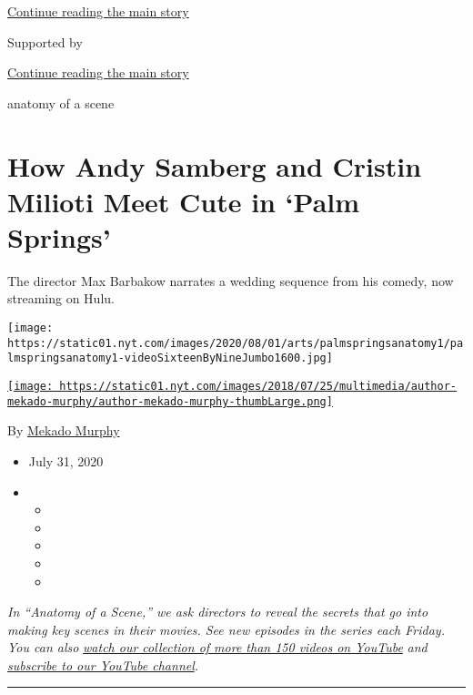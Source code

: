 \protect\hyperlink{after-top}{Continue reading the main story}

Supported by

\protect\hyperlink{after-sponsor}{Continue reading the main story}

anatomy of a scene

\hypertarget{how-andy-samberg-and-cristin-milioti-meet-cute-in-palm-springs}{%
\section{How Andy Samberg and Cristin Milioti Meet Cute in `Palm
Springs'}\label{how-andy-samberg-and-cristin-milioti-meet-cute-in-palm-springs}}

The director Max Barbakow narrates a wedding sequence from his comedy,
now streaming on Hulu.

\texttt{[image: https://static01.nyt.com/images/2020/08/01/arts/palmspringsanatomy1/palmspringsanatomy1-videoSixteenByNineJumbo1600.jpg]}

\href{https://www.nytimes.com/by/mekado-murphy}{\texttt{[image: https://static01.nyt.com/images/2018/07/25/multimedia/author-mekado-murphy/author-mekado-murphy-thumbLarge.png]}}

By \href{https://www.nytimes.com/by/mekado-murphy}{Mekado Murphy}

\begin{itemize}
\item
  July 31, 2020
\item
  \begin{itemize}
  \item
  \item
  \item
  \item
  \item
  \end{itemize}
\end{itemize}

\emph{In ``Anatomy of a Scene,'' we ask directors to reveal the secrets
that go into making key scenes in their movies. See new episodes in the
series each Friday. You can also}
\href{https://www.youtube.com/playlist?list=PL4CGYNsoW2iBup_LVjhX7C9qceoMpiLEL}{\emph{watch
our collection of more than 150 videos on YouTube}} \emph{and}
\href{https://www.youtube.com/channel/UCqnbDFdCpuN8CMEg0VuEBqA?sub_confirmation=1}{\emph{subscribe
to our YouTube channel}}\emph{.}

\begin{center}\rule{0.5\linewidth}{\linethickness}\end{center}

